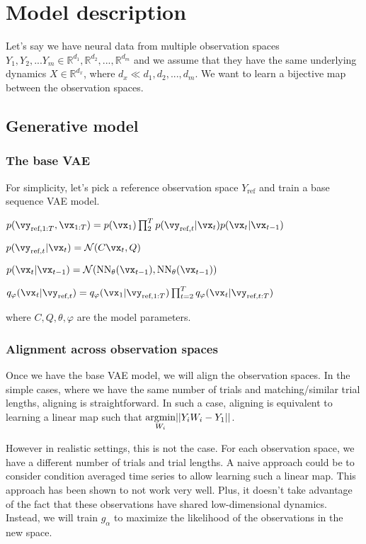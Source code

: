 \section{Model description}
Let's say we have neural data from multiple observation spaces $Y_1, Y_2, ... Y_m \in \mathbb{R}^{d_1}, \mathbb{R}^{d_2}, ... ,\mathbb{R}^{d_m}$ and we assume that they have the same underlying dynamics $X \in \mathbb{R}^{d_x}$, where $d_x \ll d_1, d_2, ..., d_m$. We want to learn a bijective map between the observation spaces.  


\subsection{Generative model}

\subsubsection{The base VAE}

For simplicity, let's pick a reference observation space $Y_\text{ref}$ and train a base sequence VAE model. 
\begin{center}
    $p(\vy_{\text{ref},1:T}, \vx_{1:T}) = p(\vx_1) \prod_{2}^{T}p(\vy_{\text{ref},t}|\vx_t) p(\vx_t|\vx_{t-1})$

    $p(\vy_{\text{ref},t}|\vx_t) = \mathcal{N}(C\vx_t, Q)$

    $p(\vx_t|\vx_{t-1}) = \mathcal{N} (\text{NN}_{\theta} (\vx_{t-1}), \text{NN}_{\theta} (\vx_{t-1}))$

    $q_{\varphi}(\vx_t|\vy_{\text{ref},t}) = q_{\varphi}(\vx_1|\vy_{\text{ref},1:T}) \prod_{t=2}^{T} q_{\varphi} (\vx_t | \vy_{\text{ref},t:T}) $

\end{center}

where $C, Q, \theta, \varphi$ are the model parameters. 

\subsubsection{Alignment across observation spaces}

Once we have the base VAE model, we will align the observation spaces. In the simple cases, where we have the same number of trials and matching/similar trial lengths, aligning is straightforward. In such a case, aligning is equivalent to learning a linear map such that $ \underset{W_i}{\operatorname*{argmin}} ||Y_iW_i - Y_1|| $. 

However in realistic settings, this is not the case. For each observation space, we have a different number of trials and trial lengths. A naive approach could be to consider condition averaged time series to allow learning such a linear map. This approach has been shown to not work very well. Plus, it doesn't take advantage of the fact that 
these observations have shared low-dimensional dynamics. Instead, we will train $g_{\alpha}$ to maximize the likelihood of the observations in the new space.

